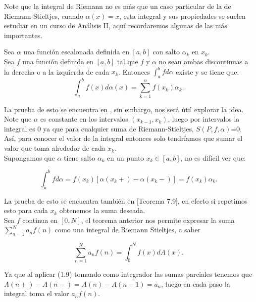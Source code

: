 Note que la integral de Riemann no es más que un caso particular de la de Riemann-Stieltjes, cuando $\alpha(x)=x$, esta integral y sus propiedades se suelen estudiar en un curso de Análisis II, aquí recordaremos algunas de  las más importantes.\\

\begin{theorem}
  Sea $\alpha$ una función escalonada definida en $[a, b]$ con salto $\alpha_k$ en $x_k$.\\
  
Sea $f$ una función definida en $[a, b]$ tal que $f$ y $\alpha$ no sean ambas discontinuas a la derecha o a la izquierda de cada $x_k$. Entonces $\displaystyle\int_a^b f d \alpha$ existe y se tiene que:
$$
\int_a^b f(x) d \alpha(x)=\sum_{k=1}^n f\left(x_k\right) \alpha_k.
$$
\end{theorem}

La prueba de esto se encuentra en \cite{Apostol:105425}, sin embargo, nos será útil explorar la idea.\\

Note que $\alpha$ es constante en los intervalos $(x_{k-1},x_k)$, luego por intervalos la integral es 0 ya que para cualquier suma de Riemann-Stieltjes, $S(P,f,\alpha)$=0. Así, para conocer el valor de la integral entonces solo tendríamos que sumar el valor que toma alrededor de cada $x_k$.\\

Supongamos que $\alpha$ tiene salto $\alpha_k $ en un punto $x_k\in [a,b]$, no es difícil ver que:

\begin{equation}
\int_a^bfd\alpha=f(x_k)[\alpha(x_k+)-\alpha(x_{k}-)]=f(x_k)\alpha_k.
\end{equation}

La prueba de esto se encuentra también en \cite{Apostol:105425} [Teorema 7.9], en efecto si repetimos esto para cada $x_k$ obtenemos la suma deseada.\\

Sea $f$ continua en $[0,N]$, el teorema anterior nos permite expresar la suma $\displaystyle\sum_{n=1}^Na_nf(n)$ como una integral de Riemann Stieltjes, a saber

$$\displaystyle\sum_{n=1}^Na_nf(n)=\int_0^Nf(x)dA(x).$$

Ya que al aplicar (1.9) tomando como integrador las sumas parciales tenemos que $A(n+)-A(n-)=A(n)-A(n-1)=a_n$, luego en cada paso la integral toma el valor $a_nf(n)$.\\

